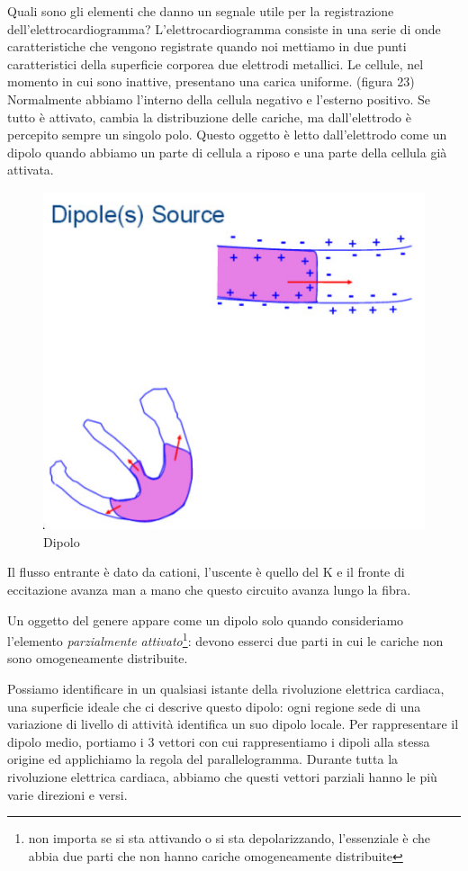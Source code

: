 \documentclass[a4paper,12pt]{article}
\begin{document}
Quali sono gli elementi che danno un segnale utile per la registrazione dell'elettrocardiogramma? L'elettrocardiogramma consiste in una serie di onde caratteristiche che vengono registrate quando noi mettiamo in due punti caratteristici della superficie corporea due elettrodi metallici. Le cellule, nel momento in cui sono inattive, presentano una carica uniforme. (figura 23) Normalmente abbiamo l'interno della cellula negativo e l'esterno positivo. Se tutto è attivato, cambia la distribuzione delle cariche, ma dall'elettrodo è percepito sempre un singolo polo. Questo oggetto è letto dall'elettrodo come un dipolo quando abbiamo un parte di cellula a riposo e una parte della cellula già attivata. 
\begin{figure}[H]
\centering
\includegraphics[scale=0.4]{immagine/dipolo.jpg}
\caption{Dipolo}
\end{figure}

Il flusso entrante è dato da cationi, l'uscente è quello del K e il fronte di eccitazione avanza man a mano che questo circuito avanza lungo la fibra. 

Un oggetto del genere appare come un dipolo solo quando consideriamo l'elemento \emph{parzialmente attivato}\footnote{non importa se si sta attivando o si sta depolarizzando, l'essenziale è che abbia due parti che non hanno cariche omogeneamente distribuite}: devono esserci due parti in cui le cariche non sono omogeneamente distribuite.

Possiamo identificare in un qualsiasi istante della rivoluzione elettrica cardiaca, una superficie ideale che ci descrive questo dipolo: ogni regione sede di una variazione di livello di attività identifica un suo dipolo locale. Per rappresentare il dipolo medio, portiamo i 3 vettori con cui rappresentiamo i dipoli alla stessa origine ed applichiamo la regola del parallelogramma. Durante tutta la rivoluzione elettrica cardiaca, abbiamo che questi vettori parziali hanno le più varie direzioni e versi. 
\end{document}
